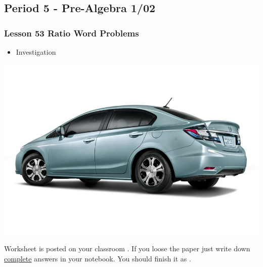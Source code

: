    	 \subsection[PA1/02]{Period 5 - Pre-Algebra 1/02}
   	    \begin{frame}[label=PA1_02]
   	    		\frametitle{Lesson 53 Ratio Word Problems}   
    
        \begin{itemize}
     	    \item {} Investigation 
      \end{itemize}   
      \vspace{-20pt}
        \begin{center}
\includegraphics[width=0.5\linewidth]{Images/honda_civic}
\end{center}      
           \vspace{-20pt}
         \begin{alertblock}{}
         	Worksheet is posted on your  classroom .
         	If you loose the paper just write down \underline{complete} answers in your notebook. You should finish it as .	
         \end{alertblock}
   	  \end{frame}
      
